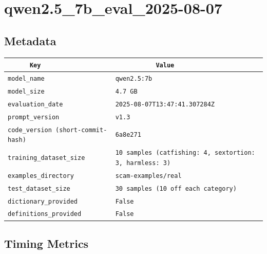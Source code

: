 \documentclass{article}
\begin{document}
\section{qwen2.5\_7b\_eval\_2025-08-07}
\subsection{Metadata}

\begin{center}
\begin{tabular}{l | l} \hline
    \verb|      Key      | & \verb|           Value           | \\ \hline
    \hline
    \verb|model_name    | & \verb|qwen2.5:7b                   | \\ \hline
    \verb|model_size    | & \verb|4.7 GB                       | \\ \hline
    \verb|evaluation_date| & \verb|2025-08-07T13:47:41.307284Z  | \\ \hline
    \verb|prompt_version| & \verb|v1.3                         | \\ \hline
    \verb|code_version (short-commit-hash)| & \verb|6a8e271                      | \\ \hline
    \verb|training_dataset_size| & \verb|10 samples (catfishing: 4, sextortion: 3, harmless: 3)| \\ \hline
    \verb|examples_directory| & \verb|scam-examples/real           | \\ \hline
    \verb|test_dataset_size| & \verb|30 samples (10 off each category)| \\ \hline
    \verb|dictionary_provided| & \verb|False                        | \\ \hline
    \verb|definitions_provided| & \verb|False                        | \\ \hline
\end{tabular}
\end{center}

\subsection{Timing Metrics}
\end{document}
